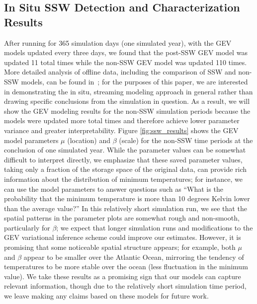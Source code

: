 \documentclass{juliacon}
\begin{document}
\subsection{In Situ SSW Detection and Characterization Results}
After running for 365 simulation days (one simulated year), with the GEV models updated every three days, we found that the post-SSW GEV model was updated 11 total times while the non-SSW GEV model was updated 110 times.
More detailed analysis of offline data, including the comparison of SSW and non-SSW models, can be found in~\cite{ssw_isav}; for the purposes of this paper, we are interested in demonstrating the in situ, streaming modeling approach in general rather than drawing specific conclusions from the simulation in question. As a result, we will show the GEV modeling results for the non-SSW simulation periods because the models were updated more total times and therefore achieve lower parameter variance and greater interpretability.
Figure \ref{fig:ssw_results} shows the GEV model parameters $\mu$ (location) and $\beta$ (scale) for the non-SSW time periods at the conclusion of one simulated year. 
While the parameter values can be somewhat difficult to interpret directly, we emphasize that these saved parameter values, taking only a fraction of the storage space of the original data, can provide rich information about the distribution of minimum temperatures; for instance, we can use the model parameters to answer questions such as ``What is the probability that the minimum temperature is more than 10 degrees Kelvin lower than the average value?''
In this relatively short simulation run, we see that the spatial patterns in the parameter plots are somewhat rough and non-smooth, particularly for $\beta$; we expect that longer simulation runs and modifications to the GEV variational inference scheme could improve our estimates. 
However, it is promising that some noticeable spatial structure appears; for example, both $\mu$ and $\beta$ appear to be smaller over the Atlantic Ocean, mirroring the tendency of temperatures to be more stable over the ocean (less fluctuation in the minimum value). 
We take these results as a promising sign that our models can capture relevant information, though due to the relatively short simulation time period, we leave making any claims based on these models for future work.
\end{document}
